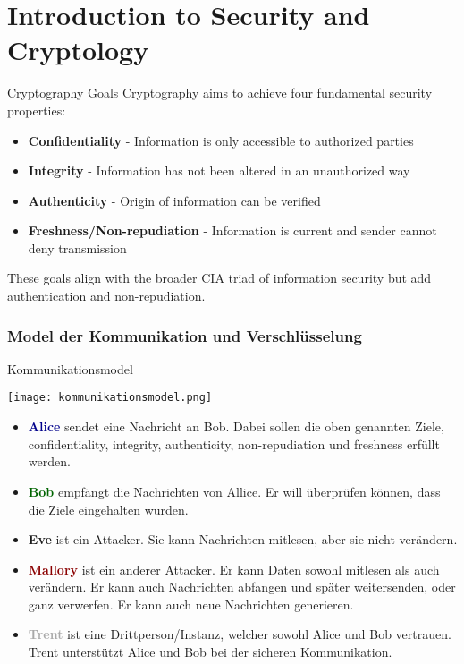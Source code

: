 \section{Introduction to Security and Cryptology}

\begin{definition}{Cryptography Goals}
    Cryptography aims to achieve four fundamental security properties:
    \begin{itemize}
        \item \textbf{Confidentiality} - Information is only accessible to authorized parties
        \item \textbf{Integrity} - Information has not been altered in an unauthorized way
        \item \textbf{Authenticity} - Origin of information can be verified
        \item \textbf{Freshness/Non-repudiation} - Information is current and sender cannot deny transmission
    \end{itemize}
    These goals align with the broader CIA triad of information security but add authentication and non-repudiation.
\end{definition}


\subsubsection{Model der Kommunikation und Verschlüsselung}

\begin{definition}{Kommunikationsmodel}

    \begin{minipage}{0.4\linewidth}
    \texttt{[image: kommunikationsmodel.png]}
    \end{minipage}
    \begin{minipage}{0.6\linewidth}
    \begin{itemize}
        \item \textcolor{darkblue}{\textbf{Alice}} sendet eine Nachricht an Bob. Dabei sollen die oben genannten Ziele, confidentiality, integrity, authenticity, non-repudiation und freshness erfüllt werden.
        \item \textcolor{darkgreen}{\textbf{Bob}} empfängt die Nachrichten von Allice. Er will überprüfen können, dass die Ziele eingehalten wurden.
        \item \textcolor{darktangerine}{\textbf{Eve}}  ist ein Attacker. Sie kann Nachrichten mitlesen, aber sie nicht verändern.
        \item \textcolor{darkred}{\textbf{Mallory}} ist ein anderer Attacker. Er kann Daten sowohl mitlesen als auch verändern. Er kann auch Nachrichten abfangen und später weitersenden, oder ganz verwerfen. Er kann auch neue Nachrichten generieren.
        \item \textcolor{darkgrey}{\textbf{Trent}} ist eine Drittperson/Instanz, welcher sowohl Alice und Bob vertrauen. Trent unterstützt Alice und Bob bei der sicheren Kommunikation.
    \end{itemize}
    \end{minipage}
\end{definition}

